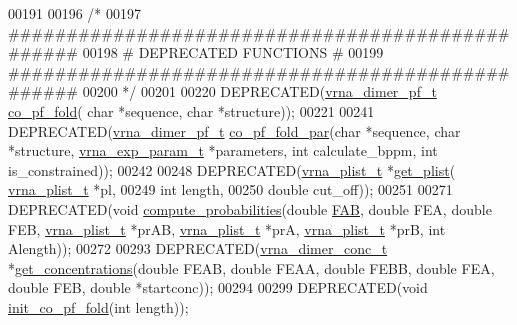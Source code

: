 \begin{DoxyCode}
00191 
00196 \textcolor{comment}{/*}
00197 \textcolor{comment}{#################################################}
00198 \textcolor{comment}{# DEPRECATED FUNCTIONS                          #}
00199 \textcolor{comment}{#################################################}
00200 \textcolor{comment}{*/}
00201 
00220 DEPRECATED(\hyperlink{group__pf__cofold_structvrna__dimer__pf__s}{vrna\_dimer\_pf\_t} \hyperlink{part__func__co_8h_ae5c1e7331718669bdae7a86de2be6184}{co\_pf\_fold}( \textcolor{keywordtype}{char} *sequence, \textcolor{keywordtype}{char} *structure));
00221 
00241 DEPRECATED(\hyperlink{group__pf__cofold_structvrna__dimer__pf__s}{vrna\_dimer\_pf\_t} \hyperlink{part__func__co_8h_aabfc6cb6d02b8f08ac4c92f4f5b125d9}{co\_pf\_fold\_par}(\textcolor{keywordtype}{char} *sequence, \textcolor{keywordtype}{char} *structure, 
      \hyperlink{group__energy__parameters_structvrna__exp__param__s}{vrna\_exp\_param\_t} *parameters, \textcolor{keywordtype}{int} calculate\_bppm, \textcolor{keywordtype}{int} is\_constrained));
00242 
00248 DEPRECATED(\hyperlink{group__data__structures_structvrna__plist__s}{vrna\_plist\_t}  *\hyperlink{part__func__co_8h_a162b6177b14a4156172105a34c09f278}{get\_plist}( \hyperlink{group__data__structures_structvrna__plist__s}{vrna\_plist\_t} *pl,
00249                               \textcolor{keywordtype}{int} length,
00250                               \textcolor{keywordtype}{double} cut\_off));
00251 
00271 DEPRECATED(\textcolor{keywordtype}{void} \hyperlink{part__func__co_8h_a21f8f4a97f904d5d805d571081b2f5f9}{compute\_probabilities}(\textcolor{keywordtype}{double} \hyperlink{group__pf__cofold_a01a87f59db2b7fbf883b056e6f6c673a}{FAB}, \textcolor{keywordtype}{double} FEA, \textcolor{keywordtype}{double} FEB, 
      \hyperlink{group__data__structures_structvrna__plist__s}{vrna\_plist\_t}  *prAB, \hyperlink{group__data__structures_structvrna__plist__s}{vrna\_plist\_t}  *prA, \hyperlink{group__data__structures_structvrna__plist__s}{vrna\_plist\_t}  *prB, \textcolor{keywordtype}{int} 
      Alength));
00272 
00293 DEPRECATED(\hyperlink{group__pf__cofold_structvrna__dimer__conc__s}{vrna\_dimer\_conc\_t} *\hyperlink{part__func__co_8h_a163159722a422ba90335a601fc34b8fb}{get\_concentrations}(\textcolor{keywordtype}{double} FEAB, \textcolor{keywordtype}{double} 
      FEAA, \textcolor{keywordtype}{double} FEBB, \textcolor{keywordtype}{double} FEA, \textcolor{keywordtype}{double} FEB, \textcolor{keywordtype}{double} *startconc));
00294 
00299 DEPRECATED(\textcolor{keywordtype}{void}   \hyperlink{part__func__co_8h_aa12dda9dd6179cdd22bcce87c0682c07}{init\_co\_pf\_fold}(\textcolor{keywordtype}{int} length));

\end{DoxyCode}
